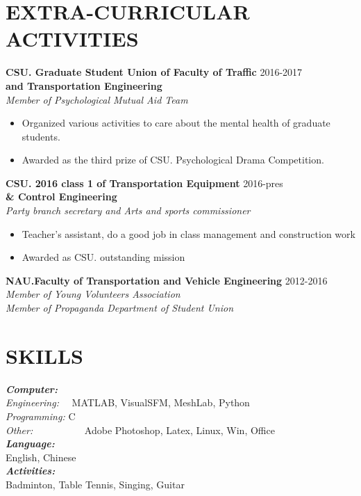 \documentclass[margin]{res}
\begin{document}
\begin{resume}
\section{EXTRA-CURRICULAR \\ ACTIVITIES}   
            \textbf { CSU. Graduate Student Union of Faculty of Traffic}  \hfill{2016-2017}  \\\textbf {and Transportation Engineering}     \\  
            {\it Member of Psychological Mutual Aid Team}  
            \begin{itemize}  
                 \item Organized various activities to care about the mental health of graduate students. 
                 \end{itemize} 
                 \begin{itemize}  
                 \item  Awarded as  the third prize of CSU. Psychological Drama Competition. 
                 \end{itemize} 
                 \textbf { CSU. 2016 class 1 of Transportation Equipment }  \hfill{2016-pres}\\
                 \textbf {\& Control Engineering }\\
              {\it Party branch secretary and Arts and sports commissioner} 
              \begin{itemize}  
                 \item  Teacher's assistant,  do a good job in class management and construction work
                 \item Awarded as  CSU. outstanding mission
                 \end{itemize} 
                  \textbf { NAU.Faculty of Transportation and Vehicle Engineering  }  \hfill{2012-2016}\\
                 {\it Member of Young Volunteers Association} \\
                 {\it Member of  Propaganda Department of Student Union} 
             
                
                
\section{ SKILLS }  \textbf {\textit {Computer:}}\\  
 {\sl Engineering:}  \ \ MATLAB, VisualSFM, MeshLab, Python\\ 
 {\sl Programming:} C\\
 {\sl Other:} \ \ \ \ \ \ \ \ \ \ Adobe Photoshop, Latex,  Linux, Win, Office\\
    \textbf {\textit {Language:}} \\ English, Chinese\\
    \textbf {\textit {Activities:}} \\ Badminton, Table Tennis, Singing, Guitar
      
                 
 

\end{resume}
\end{document}
